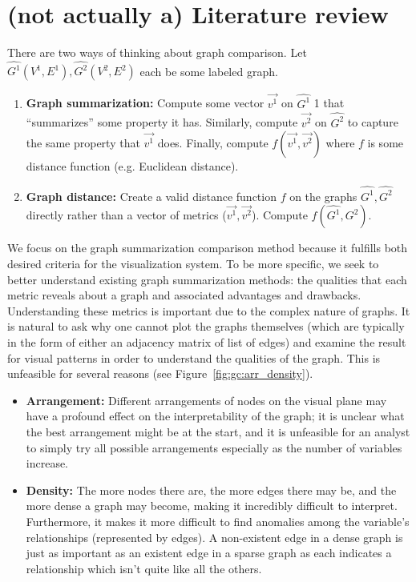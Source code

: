 \section{(not actually a) Literature review}
\label{sec:gc:litreview}

There are two ways of thinking about graph comparison. Let $\hat{G^1}(V^1,E^1), 
\hat{G^2}(V^2,E^2)$ each be some labeled graph. 

\tablespacing
\begin{enumerate}
	\item \textbf{Graph summarization:} Compute some vector 
	$\overrightarrow{v^1}$ on $\hat{G^1}$ 1 that ``summarizes'' some property 
	it has. Similarly, compute $\overrightarrow{v^2}$ on $\hat{G^2}$ to capture 
	the same property that $\overrightarrow{v^1}$ does. Finally, compute 
	$f(\overrightarrow{v^1},\overrightarrow{v^2})$ where $f$ is some distance 
	function (e.g. Euclidean distance).
	
	\item \textbf{Graph distance:} Create a valid distance function $f$ on the 
	graphs $\hat{G^1}, \hat{G^2}$ directly rather than a vector of metrics 
	($\overrightarrow{v^1},\overrightarrow{v^2}$). 
	Compute $f(\hat{G^1},\hat{G^2})$.
\end{enumerate}
\bodyspacing

We focus on the graph summarization comparison method because it fulfills both 
desired criteria for the visualization system. To be more specific, we seek to 
better understand existing graph summarization methods: the qualities that each 
metric reveals about a graph and associated advantages and drawbacks. 
Understanding these metrics is important due to the complex nature of graphs.
It is natural to ask why one cannot plot the graphs themselves (which are 
typically in the form of either an adjacency matrix of list of edges) and 
examine the result for visual patterns in order to understand the qualities 
of the graph. This is unfeasible for several reasons (see 
Figure~\ref{fig:gc:arr_density}). 

\tablespacing
\begin{itemize}
	\item \textbf{Arrangement:} Different arrangements of nodes on the visual 
	plane may have a profound effect on the interpretability of the graph; it 
	is unclear what the best arrangement might be at the start, and it is 
	unfeasible for an analyst to simply try all possible arrangements 
	especially as the number of variables increase.
	
	\item \textbf{Density:} The more nodes there are, the more edges there may 
	be, and the more dense a graph may become, making it incredibly difficult 
	to interpret. Furthermore, it makes it more difficult to find anomalies 
	among the variable's relationships (represented by edges). A non-existent 
	edge in a dense graph is just as important as an existent edge in a sparse 
	graph as each indicates a relationship which isn't quite like all the 
	others.
\end{itemize}
\bodyspacing

